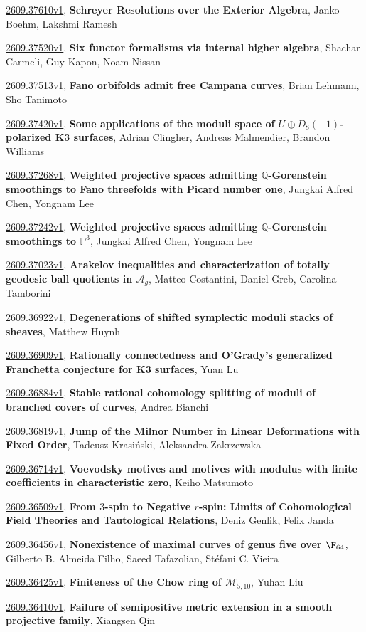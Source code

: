 \documentclass[9pt, a4paper]{article}
\theoremstyle{plain}
\theoremstyle{definition}
\theoremstyle{remark}
\newcommand{\arxiv}[3]{\href{https://arxiv.org/abs/#1}{#1}, \textbf{\textcolor{arxivblue}{#2}}, #3}
\begin{document}
\arxiv{2609.37610v1}{Schreyer Resolutions over the Exterior Algebra}{Janko Boehm, Lakshmi Ramesh}

\arxiv{2609.37520v1}{Six functor formalisms via internal higher algebra}{Shachar Carmeli, Guy Kapon, Noam Nissan}

\arxiv{2609.37513v1}{Fano orbifolds admit free Campana curves}{Brian Lehmann, Sho Tanimoto}

\arxiv{2609.37420v1}{Some applications of the moduli space of $U\oplus D_8(-1)$-polarized K3 surfaces}{Adrian Clingher, Andreas Malmendier, Brandon Williams}

\arxiv{2609.37268v1}{Weighted projective spaces admitting $\mathbb Q$-Gorenstein smoothings to Fano threefolds with Picard number one}{Jungkai Alfred Chen, Yongnam Lee}

\arxiv{2609.37242v1}{Weighted projective spaces admitting $\mathbb Q$-Gorenstein smoothings to $\mathbb P^3$}{Jungkai Alfred Chen, Yongnam Lee}

\arxiv{2609.37023v1}{Arakelov inequalities and characterization of totally geodesic ball quotients in $\mathcal{A}_g$}{Matteo Costantini, Daniel Greb, Carolina Tamborini}

\arxiv{2609.36922v1}{Degenerations of shifted symplectic moduli stacks of sheaves}{Matthew Huynh}

\arxiv{2609.36909v1}{Rationally connectedness and O'Grady's generalized Franchetta conjecture for K3 surfaces}{Yuan Lu}

\arxiv{2609.36884v1}{Stable rational cohomology splitting of moduli of branched covers of curves}{Andrea Bianchi}

\arxiv{2609.36819v1}{Jump of the Milnor Number in Linear Deformations with Fixed Order}{Tadeusz Krasiński, Aleksandra Zakrzewska}

\arxiv{2609.36714v1}{Voevodsky motives and motives with modulus with finite coefficients in characteristic zero}{Keiho Matsumoto}

\arxiv{2609.36509v1}{From $3$-spin to Negative $r$-spin: Limits of Cohomological Field Theories and Tautological Relations}{Deniz Genlik, Felix Janda}

\arxiv{2609.36456v1}{Nonexistence of maximal curves of genus five over $\F_{64}$}{Gilberto B. Almeida Filho, Saeed Tafazolian, Stéfani C. Vieira}

\arxiv{2609.36425v1}{Finiteness of the Chow ring of $\mathcal{M}_{5,10}$}{Yuhan Liu}

\arxiv{2609.36410v1}{Failure of semipositive metric extension in a smooth projective family}{Xiangsen Qin}
\end{document}
